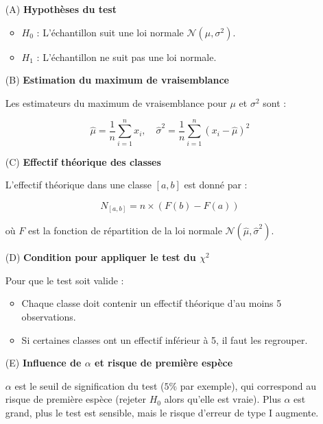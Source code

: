 \documentclass{article}
\begin{document}
\begin{enumerate}
    \item[(A)] \textbf{Hypothèses du test}
    \begin{itemize}
        \item \( H_0 \) : L’échantillon suit une loi normale \( \mathcal{N}(\mu, \sigma^2) \).
        \item \( H_1 \) : L’échantillon ne suit pas une loi normale.
    \end{itemize}
    
    \item[(B)] \textbf{Estimation du maximum de vraisemblance}
    
    Les estimateurs du maximum de vraisemblance pour \( \mu \) et \( \sigma^2 \) sont :
    
    \[
    \hat{\mu} = \frac{1}{n} \sum_{i=1}^{n} x_i, \quad
    \hat{\sigma}^2 = \frac{1}{n} \sum_{i=1}^{n} (x_i - \hat{\mu})^2
    \]

    \item[(C)] \textbf{Effectif théorique des classes}
    
    L’effectif théorique dans une classe \( [a, b] \) est donné par :
    
    \[
    N_{[a,b]} = n \times (F(b) - F(a))
    \]

    où \( F \) est la fonction de répartition de la loi normale \( \mathcal{N}(\hat{\mu}, \hat{\sigma}^2) \).

    \item[(D)] \textbf{Condition pour appliquer le test du \( \chi^2 \)}
    
    Pour que le test soit valide :
    \begin{itemize}
        \item Chaque classe doit contenir un effectif théorique d’au moins 5 observations.
        \item Si certaines classes ont un effectif inférieur à 5, il faut les regrouper.
    \end{itemize}
    
    \item[(E)] \textbf{Influence de \( \alpha \) et risque de première espèce}
    
    \( \alpha \) est le seuil de signification du test (\( 5\% \) par exemple), qui correspond au risque de première espèce (rejeter \( H_0 \) alors qu’elle est vraie). Plus \( \alpha \) est grand, plus le test est sensible, mais le risque d’erreur de type I augmente.
\end{enumerate}
\end{document}
